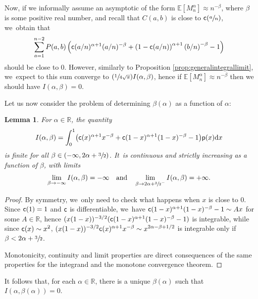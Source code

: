 \documentclass[11pt]{article}
\newcommand{\Psfrac}[2]{(\sfrac{#1}{#2})}
\newcommand{\pp}{\mathsf{p}}
\newcommand{\E}{\mathbb{E}}
\newcommand{\R}{{\mathbb{R}}}
\newcommand{\dd}{\mathrm{d}}
\newtheorem{lem}[thm]{Lemma}
\theoremstyle{definition}
\begin{document}
Now, if we informally assume an asymptotic of the form $\E[M_n^\alpha] \approx n^{-\beta}$, where $\beta$ is some positive real number, and recall that $C(a,b)$ is close to $\mathsf{c}(\sfrac{a}{n})$, we~obtain that
\[
\sum_{a=1}^{n-2}P(a,b)\left(\mathsf{c}(a/n)^{\alpha+1} (a/n)^{-\beta}+\left(1-\mathsf{c}(a/n)\right)^{\alpha+1} \left(b/n\right)^{-\beta}-1\right)
\]
should be close to $0$. However, similarly to Proposition \ref{prop:generalintegrallimit}, we~expect to this sum converge to $\Psfrac{1}{4\sqrt{\pi}} I(\alpha,\beta)$, hence if $\E[M_n^\alpha] \approx n^{-\beta}$ then we should have $I(\alpha,\beta)=0$.

Let us now consider the problem of determining $\beta(\alpha)$ as a function of $\alpha$:
\begin{lem}
For $\alpha\in\R$, the quantity\vspace*{-3pt}
\[
I(\alpha,\beta)=\int_0^1 \bigl(\ff(x)^{\alpha+1} x^{-\beta}+\ff(1-x)^{\alpha+1} (1-x)^{-\beta}-1\bigr)\pp(x)\dd x
\]
is finite for all $\beta \in (-\infty,2\alpha+\sfrac{3}{2})$. It~is continuous and strictly increasing as a function of $\beta$, with limits\vspace*{-3pt}
\[
\lim_{\beta\to -\infty}I(\alpha,\beta)=-\infty\quad\text{and}\quad\lim_{\beta\to2\alpha+\sfrac{3}{2}^-}I(\alpha,\beta)=+\infty.
\]
\end{lem}

\begin{proof}
By symmetry, we~only need to check what happens when $x$ is close to $0$. Since $\mathsf{c}(1)=1$ and $\mathsf{c}$ is differentiable, we~have $\mathsf{c}(1-x)^{\alpha+1} (1-x)^{-\beta}-1 \sim Ax$ for some $A\in\R$, hence $(x(1-x))^{-3/2}(\mathsf{c}(1-x)^{\alpha+1} (1-x)^{-\beta}-1)$ is integrable, while since $\mathsf{c}(x)\sim x^2$, $(x(1-x))^{-3/2}\mathsf{c}(x)^{\alpha+1}x^{-\beta}\sim x^{2\alpha-\beta+1/2}$ is integrable only if $\beta<2\alpha+\sfrac{3}{2}$.

Monotonicity, continuity and limit properties are direct consequences of the same properties for the integrand and the monotone convergence theorem.
\end{proof}

It follows that, for each $\alpha\in\R$, there is a unique $\beta(\alpha)$ such that $I(\alpha,\beta(\alpha))=0$.
\end{document}
